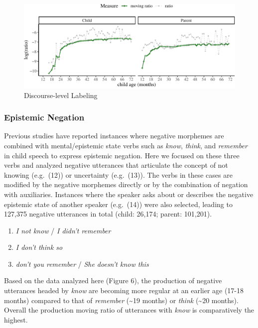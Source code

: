 \documentclass[
  english,
  man,floatsintext]{apa6}
\providecommand{\tightlist}{%
  \setlength{\itemsep}{0pt}\setlength{\parskip}{0pt}}
\begin{document}
\begin{figure}[H]

{\centering \includegraphics{neg_construction_article_files/figure-latex/learningdiscourse-1} 

}

\caption{Discourse-level Labeling}\label{fig:learningdiscourse}
\end{figure}

\clearpage

\hypertarget{epistemic-negation}{%
\subsubsection{Epistemic Negation}\label{epistemic-negation}}

Previous studies have reported instances where negative morphemes are combined with mental/epistemic state verbs such as \emph{know}, \emph{think}, and \emph{remember} in child speech to express epistemic negation. Here we focused on these three verbs and analyzed negative utterances that articulate the concept of not knowing (e.g.~(12)) or uncertainty (e.g.~(13)). The verbs in these cases are modified by the negative morphemes directly or by the combination of negation with auxiliaries. Instances where the speaker asks about or describes the negative epistemic state of another speaker (e.g.~(14)) were also selected, leading to 127,375 negative utterances in total (child: 26,174; parent: 101,201).

\begin{enumerate}
\def\labelenumi{(\arabic{enumi})}
\setcounter{enumi}{11}
\tightlist
\item
  \emph{I not know} / \emph{I didn't remember}
\item
  \emph{I don't think so}
\item
  \emph{don't you remember} / \emph{She doesn't know this}
\end{enumerate}

Based on the data analyzed here (Figure 6), the production of negative utterances headed by \emph{know} are becoming more regular at an earlier age (17-18 months) compared to that of \emph{remember} (\textasciitilde19 months) or \emph{think} (\textasciitilde20 months). Overall the production moving ratio of utterances with \emph{know} is comparatively the highest.
\end{document}
